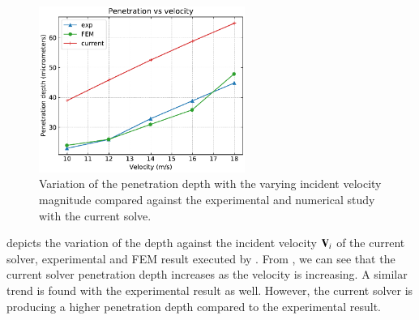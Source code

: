\begin{figure}[!htpb]
  \centering
  \includegraphics[width=0.6\textwidth]{figures/erosion/figures/cao_xuerui_2022_spherical_particle_impact_3d/penetration_vs_velocity}
  \caption{Variation of the penetration depth with the varying incident velocity
    magnitude compared against the experimental and numerical study with the
    current solve.}
  \label{fig:results-sphere-target-impact-vel-vs-depth}
\end{figure}
 depicts the variation of
the depth against the incident velocity $\mathbf{V}_i$ of the current solver,
experimental and FEM result executed by \cite{zang2022investigation}. From
, we can see that the
current solver penetration depth increases as the velocity is increasing. A
similar trend is found with the experimental result as well. However, the
current solver is producing a higher penetration depth compared to the
experimental result.

